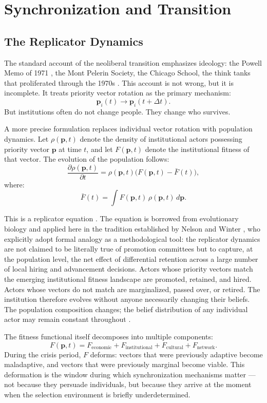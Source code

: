 \documentclass[12pt, a4paper]{article}
\theoremstyle{named}
\begin{document}
\section{Synchronization and Transition}

\subsection{The Replicator Dynamics}

The standard account of the neoliberal transition emphasizes ideology:
the Powell Memo of 1971 \cite{powell1971}, the Mont Pelerin Society,
the Chicago School, the think tanks that proliferated through the 1970s
\cite{mirowski2013}. This account is not wrong, but it is incomplete.
It treats priority vector rotation as the primary mechanism:
\[
  \mathbf{p}_i(t) \to \mathbf{p}_i(t + \Delta t).
\]
But institutions often do not change people. They change who survives.

A more precise formulation replaces individual vector rotation with
population dynamics. Let $\rho(\mathbf{p}, t)$ denote the density of
institutional actors possessing priority vector $\mathbf{p}$ at time
$t$, and let $F(\mathbf{p}, t)$ denote the institutional fitness of
that vector. The evolution of the population follows:
\[
  \frac{\partial \rho(\mathbf{p},t)}{\partial t}
  = \rho(\mathbf{p},t)\bigl(F(\mathbf{p},t) - \bar{F}(t)\bigr),
\]
where:
\[
  \bar{F}(t) = \int F(\mathbf{p},t)\,\rho(\mathbf{p},t)\,d\mathbf{p}.
\]

This is a replicator equation \cite{nelsonwinter1982,march1991}. The
equation is borrowed from evolutionary biology and applied here in the
tradition established by Nelson and Winter \cite{nelsonwinter1982}, who
explicitly adopt formal analogy as a methodological tool: the replicator
dynamics are not claimed to be literally true of promotion committees but
to capture, at the population level, the net effect of differential
retention across a large number of local hiring and advancement decisions.
Actors whose priority vectors match the emerging institutional fitness
landscape are promoted, retained, and hired. Actors whose vectors do not
match are marginalized, passed over, or retired. The institution therefore
evolves without anyone necessarily changing their beliefs. The population
composition changes; the belief distribution of any individual actor may
remain constant throughout \cite{cyertmarch1963,weick1995}.

The fitness functional itself decomposes into multiple components:
\[
  F(\mathbf{p},t)
  = F_{\text{economic}} + F_{\text{institutional}}
  + F_{\text{cultural}} + F_{\text{network}}.
\]
During the crisis period, $F$ deforms: vectors that were previously
adaptive become maladaptive, and vectors that were previously marginal
become viable. This deformation is the window during which
synchronization mechanisms matter — not because they persuade
individuals, but because they arrive at the moment when the selection
environment is briefly underdetermined.
\end{document}
